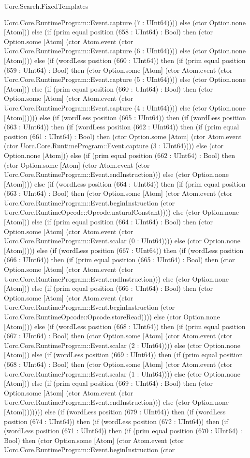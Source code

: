 \begin{lexlean}{Uorc.Search.FixedTemplates}
\begin{semanticmodule}
{Uorc.Core.RuntimeProgram::Event.capture (7 : UInt64)))) else (ctor Option.none [Atom])) else (if (prim equal position (658 : UInt64) : Bool) then (ctor Option.some [Atom] (ctor Atom.event (ctor Uorc.Core.RuntimeProgram::Event.capture (6 : UInt64)))) else (ctor Option.none [Atom]))) else (if (wordLess position (660 : UInt64)) then (if (prim equal position (659 : UInt64) : Bool) then (ctor Option.some [Atom] (ctor Atom.event (ctor Uorc.Core.RuntimeProgram::Event.capture (5 : UInt64)))) else (ctor Option.none [Atom])) else (if (prim equal position (660 : UInt64) : Bool) then (ctor Option.some [Atom] (ctor Atom.event (ctor Uorc.Core.RuntimeProgram::Event.capture (4 : UInt64)))) else (ctor Option.none [Atom]))))) else (if (wordLess position (665 : UInt64)) then (if (wordLess position (663 : UInt64)) then (if (wordLess position (662 : UInt64)) then (if (prim equal position (661 : UInt64) : Bool) then (ctor Option.some [Atom] (ctor Atom.event (ctor Uorc.Core.RuntimeProgram::Event.capture (3 : UInt64)))) else (ctor Option.none [Atom])) else (if (prim equal position (662 : UInt64) : Bool) then (ctor Option.some [Atom] (ctor Atom.event (ctor Uorc.Core.RuntimeProgram::Event.endInstruction))) else (ctor Option.none [Atom]))) else (if (wordLess position (664 : UInt64)) then (if (prim equal position (663 : UInt64) : Bool) then (ctor Option.some [Atom] (ctor Atom.event (ctor Uorc.Core.RuntimeProgram::Event.beginInstruction (ctor Uorc.Core.RuntimeOpcode::Opcode.naturalConstant)))) else (ctor Option.none [Atom])) else (if (prim equal position (664 : UInt64) : Bool) then (ctor Option.some [Atom] (ctor Atom.event (ctor Uorc.Core.RuntimeProgram::Event.scalar (0 : UInt64)))) else (ctor Option.none [Atom])))) else (if (wordLess position (667 : UInt64)) then (if (wordLess position (666 : UInt64)) then (if (prim equal position (665 : UInt64) : Bool) then (ctor Option.some [Atom] (ctor Atom.event (ctor Uorc.Core.RuntimeProgram::Event.endInstruction))) else (ctor Option.none [Atom])) else (if (prim equal position (666 : UInt64) : Bool) then (ctor Option.some [Atom] (ctor Atom.event (ctor Uorc.Core.RuntimeProgram::Event.beginInstruction (ctor Uorc.Core.RuntimeOpcode::Opcode.storeRead)))) else (ctor Option.none [Atom]))) else (if (wordLess position (668 : UInt64)) then (if (prim equal position (667 : UInt64) : Bool) then (ctor Option.some [Atom] (ctor Atom.event (ctor Uorc.Core.RuntimeProgram::Event.scalar (2 : UInt64)))) else (ctor Option.none [Atom])) else (if (wordLess position (669 : UInt64)) then (if (prim equal position (668 : UInt64) : Bool) then (ctor Option.some [Atom] (ctor Atom.event (ctor Uorc.Core.RuntimeProgram::Event.scalar (1 : UInt64)))) else (ctor Option.none [Atom])) else (if (prim equal position (669 : UInt64) : Bool) then (ctor Option.some [Atom] (ctor Atom.event (ctor Uorc.Core.RuntimeProgram::Event.endInstruction))) else (ctor Option.none [Atom]))))))) else (if (wordLess position (679 : UInt64)) then (if (wordLess position (674 : UInt64)) then (if (wordLess position (672 : UInt64)) then (if (wordLess position (671 : UInt64)) then (if (prim equal position (670 : UInt64) : Bool) then (ctor Option.some [Atom] (ctor Atom.event (ctor Uorc.Core.RuntimeProgram::Event.beginInstruction (ctor }
\end{semanticmodule}
\end{lexlean}
